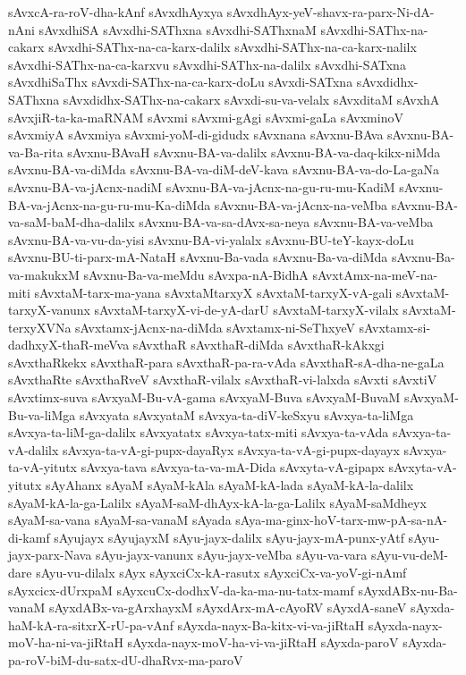 {sAvxcA-ra-roV-dha-kAnf
sAvxdhAyxya
sAvxdhAyx-yeV-shavx-ra-parx-Ni-dA-nAni
sAvxdhiSA
sAvxdhi-SAThxna
sAvxdhi-SAThxnaM
sAvxdhi-SAThx-na-cakarx
sAvxdhi-SAThx-na-ca-karx-dalilx
sAvxdhi-SAThx-na-ca-karx-nalilx
sAvxdhi-SAThx-na-ca-karxvu
sAvxdhi-SAThx-na-dalilx
sAvxdhi-SATxna
sAvxdhiSaThx
sAvxdi-SAThx-na-ca-karx-doLu
sAvxdi-SATxna
sAvxdidhx-SAThxna
sAvxdidhx-SAThx-na-cakarx
sAvxdi-su-va-velalx
sAvxditaM
sAvxhA
sAvxjiR-ta-ka-maRNAM
sAvxmi
sAvxmi-gAgi
sAvxmi-gaLa
sAvxminoV
sAvxmiyA
sAvxmiya
sAvxmi-yoM-di-gidudx
sAvxnana
sAvxnu-BAva
sAvxnu-BA-va-Ba-rita
sAvxnu-BAvaH
sAvxnu-BA-va-dalilx
sAvxnu-BA-va-daq-kikx-niMda
sAvxnu-BA-va-diMda
sAvxnu-BA-va-diM-deV-kava
sAvxnu-BA-va-do-La-gaNa
sAvxnu-BA-va-jAcnx-nadiM
sAvxnu-BA-va-jAcnx-na-gu-ru-mu-KadiM
sAvxnu-BA-va-jAcnx-na-gu-ru-mu-Ka-diMda
sAvxnu-BA-va-jAcnx-na-veMba
sAvxnu-BA-va-saM-baM-dha-dalilx
sAvxnu-BA-va-sa-dAvx-sa-neya
sAvxnu-BA-va-veMba
sAvxnu-BA-va-vu-da-yisi
sAvxnu-BA-vi-yalalx
sAvxnu-BU-teY-kayx-doLu
sAvxnu-BU-ti-parx-mA-NataH
sAvxnu-Ba-vada
sAvxnu-Ba-va-diMda
sAvxnu-Ba-va-makukxM
sAvxnu-Ba-va-meMdu
sAvxpa-nA-BidhA
sAvxtAmx-na-meV-na-miti
sAvxtaM-tarx-ma-yana
sAvxtaMtarxyX
sAvxtaM-tarxyX-vA-gali
sAvxtaM-tarxyX-vanunx
sAvxtaM-tarxyX-vi-de-yA-darU
sAvxtaM-tarxyX-vilalx
sAvxtaM-terxyXVNa
sAvxtamx-jAcnx-na-diMda
sAvxtamx-ni-SeThxyeV
sAvxtamx-si-dadhxyX-thaR-meVva
sAvxthaR
sAvxthaR-diMda
sAvxthaR-kAkxgi
sAvxthaRkekx
sAvxthaR-para
sAvxthaR-pa-ra-vAda
sAvxthaR-sA-dha-ne-gaLa
sAvxthaRte
sAvxthaRveV
sAvxthaR-vilalx
sAvxthaR-vi-lalxda
sAvxti
sAvxtiV
sAvxtimx-suva
sAvxyaM-Bu-vA-gama
sAvxyaM-Buva
sAvxyaM-BuvaM
sAvxyaM-Bu-va-liMga
sAvxyata
sAvxyataM
sAvxya-ta-diV-keSxyu
sAvxya-ta-liMga
sAvxya-ta-liM-ga-dalilx
sAvxyatatx
sAvxya-tatx-miti
sAvxya-ta-vAda
sAvxya-ta-vA-dalilx
sAvxya-ta-vA-gi-pupx-dayaRyx
sAvxya-ta-vA-gi-pupx-dayayx
sAvxya-ta-vA-yitutx
sAvxya-tava
sAvxya-ta-va-mA-Dida
sAvxyta-vA-gipapx
sAvxyta-vA-yitutx
sAyAhanx
sAyaM
sAyaM-kAla
sAyaM-kA-lada
sAyaM-kA-la-dalilx
sAyaM-kA-la-ga-Lalilx
sAyaM-saM-dhAyx-kA-la-ga-Lalilx
sAyaM-saMdheyx
sAyaM-sa-vana
sAyaM-sa-vanaM
sAyada
sAya-ma-ginx-hoV-tarx-mw-pA-sa-nA-di-kamf
sAyujayx
sAyujayxM
sAyu-jayx-dalilx
sAyu-jayx-mA-punx-yAtf
sAyu-jayx-parx-Nava
sAyu-jayx-vanunx
sAyu-jayx-veMba
sAyu-va-vara
sAyu-vu-deM-dare
sAyu-vu-dilalx
sAyx
sAyxciCx-kA-rasutx
sAyxciCx-va-yoV-gi-nAmf
sAyxcicx-dUrxpaM
sAyxcuCx-dodhxV-da-ka-ma-nu-tatx-mamf
sAyxdABx-nu-Ba-vanaM
sAyxdABx-va-gArxhayxM
sAyxdArx-mA-cAyoRV
sAyxdA-saneV
sAyxda-haM-kA-ra-sitxrX-rU-pa-vAnf
sAyxda-nayx-Ba-kitx-vi-va-jiRtaH
sAyxda-nayx-moV-ha-ni-va-jiRtaH
sAyxda-nayx-moV-ha-vi-va-jiRtaH
sAyxda-paroV
sAyxda-pa-roV-biM-du-satx-dU-dhaRvx-ma-paroV
}

